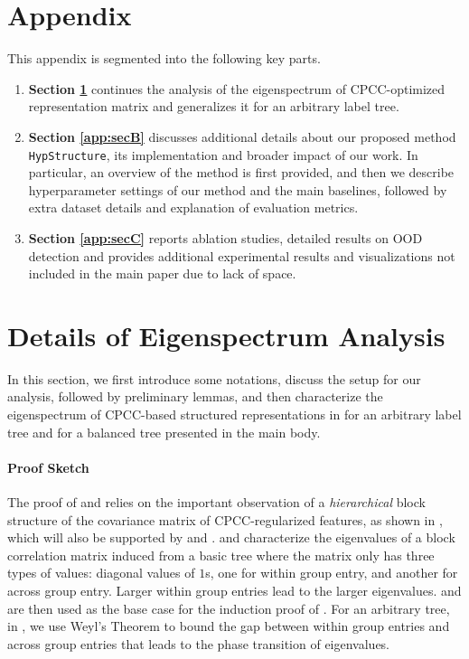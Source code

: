 \section*{Appendix}
This appendix is segmented into the following key parts.

\begin{enumerate}

    \item \textbf{Section \ref{app:sec_proof}} continues the analysis of the eigenspectrum of CPCC-optimized representation matrix and generalizes it for an arbitrary label tree. 

    \item \textbf{Section \ref{app:secB}} discusses additional details about our proposed method \texttt{HypStructure}, its implementation and broader impact of our work. In particular, an overview of the method is first provided, and then we describe hyperparameter settings of our method and the main baselines, followed by extra dataset details and explanation of evaluation metrics.
    
    \item \textbf{Section \ref{app:secC}} reports ablation studies, detailed results on OOD detection and provides additional experimental results and visualizations not included in the main paper due to lack of space.

\end{enumerate}

\section{Details of Eigenspectrum Analysis}
\label{app:sec_proof}
In this section, we first introduce some notations, discuss the setup for our analysis, followed by preliminary lemmas, and then characterize the eigenspectrum of CPCC-based structured representations in  for an arbitrary label tree and  for a balanced tree presented in the main body.

\paragraph{Proof Sketch} The proof of  and  relies on the important observation of a \emph{hierarchical} block structure of the covariance matrix of CPCC-regularized features, as shown in , which will also be supported by  and .  \citep{Cadima_Calheiros_Preto_2010} and  characterize the eigenvalues of a block correlation matrix induced from a basic tree where the matrix only has three types of values: diagonal values of $1$s, one for within group entry, and another for across group entry. Larger within group entries lead to the larger eigenvalues.  \citep{Cadima_Calheiros_Preto_2010} and  are then used as the base case for the induction proof of . For an arbitrary tree, in , we use Weyl's Theorem \citep{Weyl_1912} to bound the gap between within group entries and across group entries that leads to the phase transition of eigenvalues.

